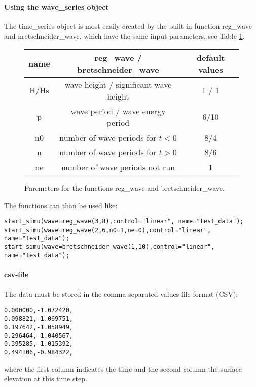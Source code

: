 \documentclass[oneside,10pt,a4paper]{book}
\begin{document}
\paragraph{Using the wave\_series object}
The time\_series object is most easily created by the built in function reg\_wave and nretschneider\_wave, which have the same input parameters, see Table \ref{tab:params_waveseries}.
\begin{figure}\label{tab:params_waveseries}
	\centering
	\begin{tabular}{|c|c|c|}
		\hline
		name & reg\_wave / bretschneider\_wave & default values\\
		\hline
		H/Hs &wave height / significant wave height& 1 / 1 \\
		\hline
		p&wave period / wave energy period&6/10\\
		\hline
		n0&number of wave periods for $t<0$&8/4\\
		\hline
		n&number of wave periods for $t>0$&8/6\\
		\hline
		ne&number of wave periods not run&1\\
		\hline
	\end{tabular}
	\caption{Paremeters for the functions reg\_wave and bretschneider\_wave.}
\end{figure}
The functions can than be used like:
\begin{verbatim}
start_simu(wave=reg_wave(3,8),control="linear", name="test_data");
start_simu(wave=reg_wave(2,6,n0=1,ne=0),control="linear", name="test_data");
start_simu(wave=bretschneider_wave(1,10),control="linear", name="test_data");
\end{verbatim}
\paragraph{csv-file}
The data must be stored in the comma separated values file format (CSV):
\begin{verbatim}
0.000000,-1.072420,
0.098821,-1.069751,
0.197642,-1.058949,
0.296464,-1.040567,
0.395285,-1.015392,
0.494106,-0.984322,
\end{verbatim}
where the first column indicates the time and the second column the surface elevation at this time step.
\end{document}
